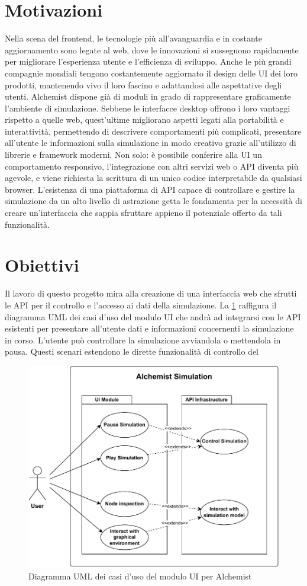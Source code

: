 \section{Motivazioni}
Nella scena del frontend, le tecnologie più all'avanguardia e in costante aggiornamento sono legate al web, dove le innovazioni si susseguono rapidamente per migliorare l'esperienza utente e l'efficienza di sviluppo. Anche le più grandi compagnie mondiali tengono costantemente aggiornato il design delle \ac{UI} dei loro prodotti, mantenendo vivo il loro fascino e adattandosi alle aspettative degli utenti. Alchemist dispone già di moduli in grado di rappresentare graficamente l'ambiente di simulazione. Sebbene le interfacce desktop offrono i loro vantaggi rispetto a quelle web, quest'ultime migliorano aspetti legati alla portabilità e interattività, permettendo di descrivere comportamenti più complicati,  presentare all'utente le informazioni sulla simulazione in modo creativo grazie all'utilizzo di librerie e framework moderni. Non solo: è possibile conferire alla \ac{UI} un comportamento responsivo, l'integrazione con altri servizi web o \ac{API} diventa più agevole, e viene richiesta la scrittura di un unico codice interpretabile da qualsiasi browser. L'esistenza di una piattaforma di \ac{API} capace di controllare e gestire la simulazione da un alto livello di astrazione getta le fondamenta per la necessità di creare un'interfaccia che sappia sfruttare appieno il potenziale offerto da tali funzionalità. 
\section{Obiettivi}
Il lavoro di questo progetto mira alla creazione di una interfaccia web che sfrutti le \ac{API} per il controllo e l'accesso ai dati della simulazione.
La \cref{fig:use-cases} raffigura il diagramma UML dei casi d'uso del modulo UI che andrà ad integrarsi con le \ac{API} esistenti per presentare all'utente dati e informazioni concernenti la simulazione in corso. L'utente può controllare la simulazione avviandola o mettendola in pausa. Questi scenari estendono le dirette funzionalità di controllo del
\begin{figure}[htb]
	\centering
	\includegraphics[width=.8\linewidth]{imgs/Use_cases.pdf}
	\caption{Diagramma UML dei casi d'uso del modulo UI per Alchemist}
	\label{fig:use-cases}
\end{figure}

